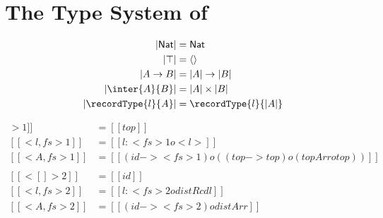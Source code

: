 
\section{The Type System of \name}

\begin{definition}
  \begin{align*}
    | \mathsf{Nat} | &= \mathsf{Nat} \\
    | \top | &= \langle \rangle \\
    | A \rightarrow B | &= | A | \rightarrow | B | \\
    | \inter{A}{B} | &= | A | \times | B | \\
    | \recordType{l}{A} | &= \recordType{l}{| A |}
  \end{align*}
\end{definition}


\begin{definition}
  \begin{align*}
    [[ < [] >1 ]] &=  [[top]] \\
    [[ < { l } , fs >1 ]] &= [[ {l : < fs >1} o < l >  ]] \\
    [[ < A , fs >1 ]] &= [[(id -> < fs >1) o ((top -> top) o (topArr o top))]] \\ \\
    [[ < [] >2 ]] &=  [[id]] \\
    [[ < { l } , fs >2 ]] &= [[ {l : < fs >2} o distRcd l  ]] \\
    [[ < A , fs >2 ]] &= [[(id -> < fs >2) o distArr]]
  \end{align*}

\end{definition}







